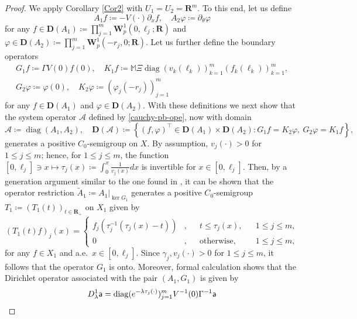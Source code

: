 \documentclass[a4paper,11pt,reqno]{amsart}
\def\la{\lambda}
\def\t{\tau}
\def\calA{{\mathcal{A}}}
\def\R{\mathbf{R}}
\theoremstyle{plain}
\numberwithin{equation}{section}
\begin{document}
\begin{proof}
We apply Corollary \ref{Cor2} with $U_1=U_2=\R^m$. To this end, let us define
\begin{equation*}
A_1 f\coloneqq - V(\cdot)\partial_x f, \quad A_2 \varphi\coloneqq \partial_\theta \varphi
\end{equation*}
for any $f\in {\bm D}(A_1)\coloneqq \prod_{j=1}^m {\bm W}_p^1(0,\ell_j;\R)$ and $\varphi\in {\bm D}(A_2)\coloneqq \prod_{j=1}^m{\bm W}_p^1(-r_j,0;\R)$. Let us further define the boundary operators
\begin{gather*}
G_1f\coloneqq \Gamma V(0)f(0),\quad K_1f\coloneqq \mathbb{M}\Xi\operatorname{diag}(v_k(\ell_{k}))_{k=1}^m (f_k(\ell_k))_{k=1}^m,\\
G_2\varphi\coloneqq \varphi(0),\quad K_2 \varphi\coloneqq (\varphi_j(-r_j))_{j=1}^m
\end{gather*} 
for any $f\in {\bm D}(A_1)$ and $\varphi \in {\bm D}(A_2)$. With these definitions we next show that the system operator $\mathcal{A}$ defined by \eqref{cauchy-pb-ope}, now with domain 
\begin{equation*}
\calA \coloneqq \operatorname{diag}(A_1,A_2),\quad {\bm D}(\calA)\coloneqq \left\{(f, \varphi)^\top\in {\bm D}(A_1)\times {\bm D}(A_2): G_1 f=K_2 \varphi,~ G_2 \varphi=K_1 f \right\},
\end{equation*}
generates a positive $C_0$-semigroup on $X$. By assumption, $v_j(\cdot)>0$ for $1\le j\le m$; hence, for $1\le j\le m$, the function $[0,\ell_j]\ni x\mapsto\tau_j(x)\coloneqq \int_{0}^{x}\frac{1}{v_j(x)}dx$ is invertible for $x\in [0,\ell_j]$. Then, by a generation argument similar to the one found in \cite{MR2328116}, it can be shown that the operator restriction $\tilde{A}_1\coloneqq A_1\vert_{\ker G_1}$ generates a positive $C_0$-semigroup $T_1\coloneqq (T_1(t))_{t\in\R_+}$ on $X_1$ given by 
\begin{equation*}
(T_1(t)f)_j(x)=\left\{\begin{split}
f_j(\t_j^{-1}(\t_j(x)-t))&,&& t \leq \tau_j(x),&& 1\le j\le m,\\
0&,&&\text{otherwise},&& 1\le j\le m,
\end{split}\right.
\end{equation*}
for any $f\in X_1$ and a.e.\ $x\in [0,\ell_j]$. Since $\gamma_j,v_j(\cdot)>0$ for $1\le j\le m$, it follows that the operator $G_1$ is onto. Moreover, formal calculation shows that the Dirichlet operator associated with the pair $(A_1,G_1)$ is given by 
\begin{equation*}
D_\la^1 \mathsf{a}={\rm diag}(e^{-\la\tau_j(\cdot)})_{j=1}^m V^{-1}(0) \Gamma^{-1} \mathsf{a}

\end{equation*}
\end{proof}
\end{document}
